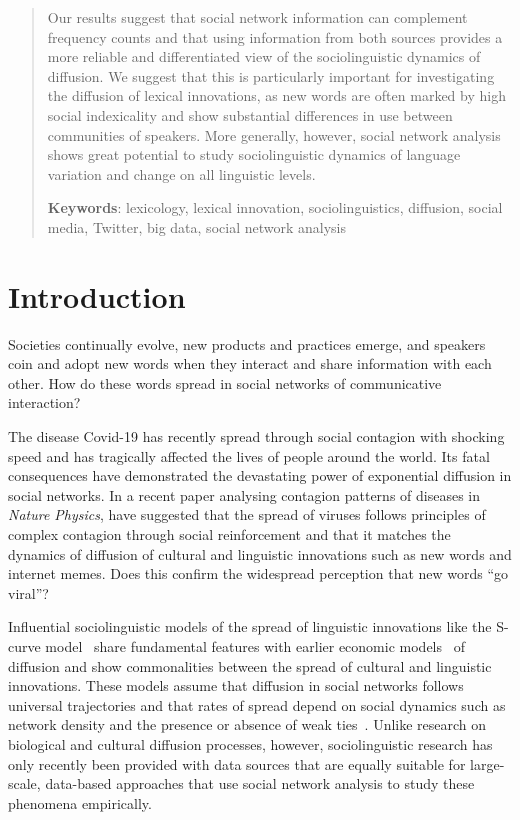 \documentclass[a4paper, abstract=on]{scrartcl}
\begin{document}
\begin{abstract}
    Our results suggest that social network information can complement frequency counts and that using information from both sources provides a more reliable and differentiated view of the sociolinguistic dynamics of  diffusion. We suggest that this is particularly important for investigating the diffusion of lexical innovations, as new words are often marked by high social indexicality and show substantial differences in use between communities of speakers. More generally, however, social network analysis shows great potential to study sociolinguistic dynamics of language variation and change on all linguistic levels.


    \vspace{2\baselineskip}

    \textbf{Keywords}: lexicology, lexical innovation, sociolinguistics, diffusion, social media, Twitter, big data, social network analysis

  \end{abstract}


\section{Introduction}

  Societies continually evolve, new products and practices emerge, and speakers coin and adopt new words when they interact and share information with each other. How do these words spread in social networks of communicative interaction?

  The disease Covid-19 has recently spread through social contagion with shocking speed and has tragically affected the lives of people around the world. Its fatal consequences have demonstrated the devastating power of exponential diffusion in social networks. In a recent paper analysing contagion patterns of diseases in \emph{Nature Physics}, \textcite{Hebert-Dufresne2020} have suggested that the spread of viruses follows principles of complex contagion through social reinforcement and that it matches the dynamics of diffusion of cultural and linguistic innovations such as new words and internet memes. Does this confirm the widespread perception that new words \enquote{go viral}?

  Influential sociolinguistic models of the spread of linguistic innovations like the S-curve model~\parencite{Milroy1992} share fundamental features with earlier economic models~\parencite{Rogers1962} of diffusion and show commonalities between the spread of cultural and linguistic innovations. These models assume that diffusion in social networks follows universal trajectories and that rates of spread depend on social dynamics such as network density and the presence or absence of weak ties~\parencite{Granovetter1977}. Unlike research on biological and cultural diffusion processes, however, sociolinguistic research has only recently been provided with data sources that are equally suitable for large-scale, data-based approaches that use social network analysis to study these phenomena empirically.
\end{document}
